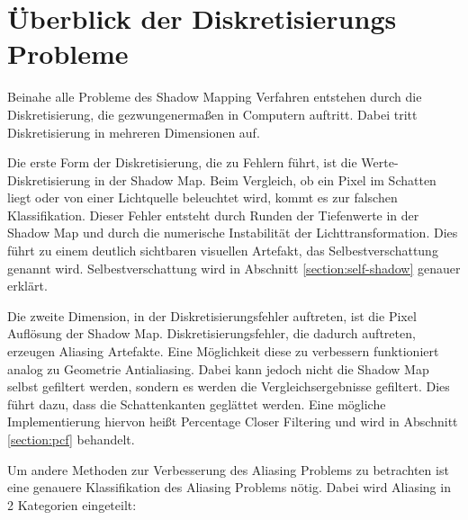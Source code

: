 \section{Überblick der Diskretisierungs Probleme}
\label{section:problem-overview}
Beinahe alle Probleme des Shadow Mapping Verfahren entstehen durch die Diskretisierung,
die gezwungenermaßen in Computern auftritt. 
Dabei tritt Diskretisierung in mehreren Dimensionen auf.
\par
Die erste Form der Diskretisierung, die zu Fehlern führt, ist die Werte-Diskretisierung 
in der Shadow Map. 
Beim Vergleich, ob ein Pixel im Schatten liegt oder von einer Lichtquelle beleuchtet wird,
kommt es zur falschen Klassifikation. Dieser Fehler entsteht durch Runden der Tiefenwerte in der Shadow Map und
durch die numerische Instabilität der Lichttransformation.
Dies führt zu einem deutlich sichtbaren visuellen Artefakt, das Selbestverschattung genannt wird.
Selbestverschattung wird in Abschnitt \ref{section:self-shadow} genauer erklärt.
\par
Die zweite Dimension, in der Diskretisierungsfehler auftreten, ist die Pixel Auflösung der Shadow Map.
Diskretisierungsfehler, die dadurch auftreten, erzeugen Aliasing Artefakte.
Eine Möglichkeit diese zu verbessern funktioniert analog zu Geometrie Antialiasing. 
Dabei kann jedoch nicht die Shadow Map selbst gefiltert werden, sondern es werden die Vergleichsergebnisse gefiltert.
Dies führt dazu, dass die Schattenkanten geglättet werden. 
Eine mögliche Implementierung hiervon heißt Percentage Closer Filtering
und wird in Abschnitt \ref{section:pcf} behandelt.
\par
Um andere Methoden zur Verbesserung des Aliasing Problems zu betrachten ist eine genauere Klassifikation des Aliasing Problems 
nötig. 
Dabei wird Aliasing in 2 Kategorien eingeteilt:
